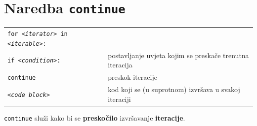 \documentclass[10pt]{article}
\begin{document}
    \section*{\color{NavyBlue} Naredba \texttt{\textbf{continue}}}
    \begin{tabular}{|>{\tt}p{9.00cm}|>{}p{15.50cm}|}
        \hline
        for \textit{<iterator>} in \textit{<iterable>}:     &                                                                                                       \\
        \hspace{5mm}if \textit{<condition>}:                & postavljanje uvjeta kojim se preskače trenutna iteracija                                              \\ 
        \hspace{5mm}continue                                & preskok iteracije                                                                                     \\ 
        \hspace{5mm}\textit{<code block>}                   & kod koji se (u suprotnom) izvršava u svakoj iteraciji                                                 \\                             
        \hline
    \end{tabular}
    \begin{center}
        \footnotesize
        \texttt{continue} služi kako bi se \textbf{preskočilo} izvršavanje \textbf{iteracije}.
    \end{center}
\end{document}

